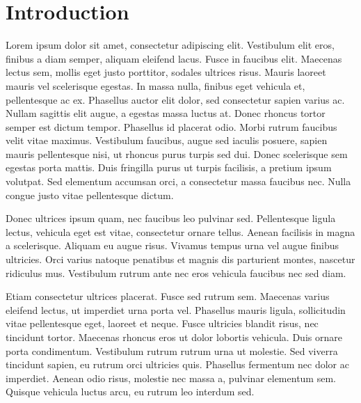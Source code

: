 \section{Introduction}
Lorem ipsum dolor sit amet, consectetur adipiscing elit. Vestibulum elit eros, finibus a diam semper, aliquam eleifend lacus. Fusce in faucibus elit. Maecenas lectus sem, mollis eget justo porttitor, sodales ultrices risus. Mauris laoreet mauris vel scelerisque egestas. In massa nulla, finibus eget vehicula et, pellentesque ac ex. Phasellus auctor elit dolor, sed consectetur sapien varius ac. Nullam sagittis elit augue, a egestas massa luctus at. Donec rhoncus tortor semper est dictum tempor. Phasellus id placerat odio. Morbi rutrum faucibus velit vitae maximus. Vestibulum faucibus, augue sed iaculis posuere, sapien mauris pellentesque nisi, ut rhoncus purus turpis sed dui. Donec scelerisque sem egestas porta mattis. Duis fringilla purus ut turpis facilisis, a pretium ipsum volutpat. Sed elementum accumsan orci, a consectetur massa faucibus nec. Nulla congue justo vitae pellentesque dictum.

Donec ultrices ipsum quam, nec faucibus leo pulvinar sed. Pellentesque ligula lectus, vehicula eget est vitae, consectetur ornare tellus. Aenean facilisis in magna a scelerisque. Aliquam eu augue risus. Vivamus tempus urna vel augue finibus ultricies. Orci varius natoque penatibus et magnis dis parturient montes, nascetur ridiculus mus. Vestibulum rutrum ante nec eros vehicula faucibus nec sed diam.

Etiam consectetur ultrices placerat. Fusce sed rutrum sem. Maecenas varius eleifend lectus, ut imperdiet urna porta vel. Phasellus mauris ligula, sollicitudin vitae pellentesque eget, laoreet et neque. Fusce ultricies blandit risus, nec tincidunt tortor. Maecenas rhoncus eros ut dolor lobortis vehicula. Duis ornare porta condimentum. Vestibulum rutrum rutrum urna ut molestie. Sed viverra tincidunt sapien, eu rutrum orci ultricies quis. Phasellus fermentum nec dolor ac imperdiet. Aenean odio risus, molestie nec massa a, pulvinar elementum sem. Quisque vehicula luctus arcu, eu rutrum leo interdum sed.